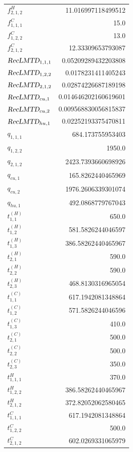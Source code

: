 \documentclass{article}%
\begin{document}
\begin{multicols*}{3}
\begin{supertabular}{lr}
	$f_{2,1,2}^{H}$ & 11.016997118499512 \\%
	$f_{1,1,1}^{C}$ & 15.0 \\%
	$f_{1,2,2}^{C}$ & 13.0 \\%
	$f_{2,1,2}^{C}$ & 12.33309653793087 \\%
	$\textsl{RecLMTD}_{1,1,1}$ & 0.05209289432203808 \\%
	$\textsl{RecLMTD}_{1,2,2}$ & 0.0178231411405243 \\%
	$\textsl{RecLMTD}_{2,1,2}$ & 0.02874226687189198 \\%
	$\textsl{RecLMTD}_{cu,1}$ & 0.014646202160619601 \\%
	$\textsl{RecLMTD}_{cu,2}$ & 0.009568830056815837 \\%
	$\textsl{RecLMTD}_{hu,1}$ & 0.02252193375470811 \\%
	$q_{1,1,1}$ & 684.173755953403 \\%
	$q_{1,2,2}$ & 1950.0 \\%
	$q_{2,1,2}$ & 2423.7393660698926 \\%
	$q_{cu,1}$ & 165.8262440465969 \\%
	$q_{cu,2}$ & 1976.2606339301074 \\%
	$q_{hu,1}$ & 492.0868779767043 \\%
	$t_{1,1}^{(H)}$ & 650.0 \\%
	$t_{1,2}^{(H)}$ & 581.5826244046597 \\%
	$t_{1,3}^{(H)}$ & 386.58262440465967 \\%
	$t_{2,1}^{(H)}$ & 590.0 \\%
	$t_{2,2}^{(H)}$ & 590.0 \\%
	$t_{2,3}^{(H)}$ & 468.8130316965054 \\%
	$t_{1,1}^{(C)}$ & 617.1942081348864 \\%
	$t_{1,2}^{(C)}$ & 571.5826244046596 \\%
	$t_{1,3}^{(C)}$ & 410.0 \\%
	$t_{2,1}^{(C)}$ & 500.0 \\%
	$t_{2,2}^{(C)}$ & 500.0 \\%
	$t_{2,3}^{(C)}$ & 350.0 \\%
	$t_{1,1,1}^{H}$ & 370.0 \\%
	$t_{1,2,2}^{H}$ & 386.58262440465967 \\%
	$t_{2,1,2}^{H}$ & 372.82052062580465 \\%
	$t_{1,1,1}^{C}$ & 617.1942081348864 \\%
	$t_{1,2,2}^{C}$ & 500.0 \\%
	$t_{2,1,2}^{C}$ & 602.0269331065979 \\%

\end{supertabular}
\end{multicols*}
\end{document}
